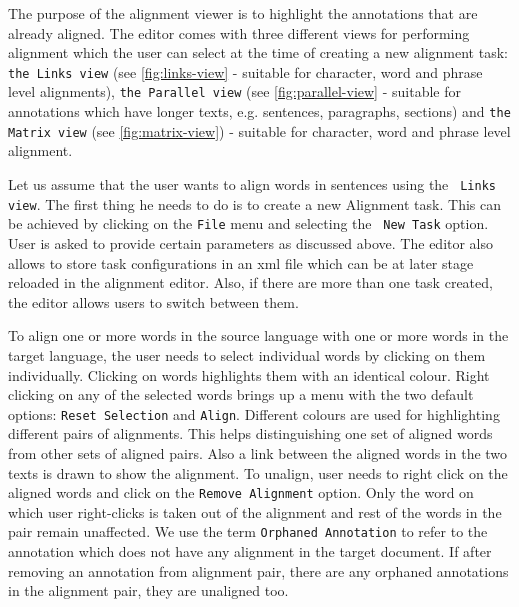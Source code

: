 The purpose of the alignment viewer is to highlight the annotations that are 
already aligned. The editor comes with three different views for performing 
alignment which the user can select at the time of creating a new alignment 
task: {\tt the Links view} (see \ref{fig:links-view} - suitable for character, 
word and phrase level alignments), {\tt the Parallel view} (see 
\ref{fig:parallel-view} - suitable for annotations which have longer texts, e.g.
sentences, paragraphs, sections)  and {\tt the Matrix view} (see 
\ref{fig:matrix-view}) - suitable for character, word and phrase level alignment. 

Let us assume that the user wants to align words in sentences using the {\tt 
Links view}.  The first thing he needs to do is to create a new Alignment task.
This can be achieved by clicking on the {\tt File} menu and selecting the {\tt
New Task} option.  User is asked to provide certain parameters as discussed 
above.  The editor also allows to store task configurations in an xml file which
can be at later stage reloaded in the alignment editor. Also, if there are more
than one task created, the editor allows users to switch between them.

To align one or more words in the source language with one or more words in the 
target language, the user needs to select individual words by clicking on them 
individually.  Clicking on words highlights them with an identical colour. Right
clicking on any of the selected words brings up a menu with the two default 
options: {\tt Reset Selection} and {\tt Align}. Different colours are used for 
highlighting different pairs of alignments. This helps distinguishing one set of
aligned words from other sets of aligned pairs. Also a link between the aligned 
words in the two texts is drawn to show the alignment. To unalign, user needs to
right click on the aligned words and click on the {\tt Remove Alignment} option. 
Only the word on which user right-clicks is taken out of the alignment and rest 
of the words in the pair remain unaffected.  We use the term {\tt Orphaned 
Annotation} to refer to the annotation which does not have any alignment in the 
target document.  If after removing an annotation from alignment pair, there are
any orphaned annotations in the alignment pair, they are unaligned too.

